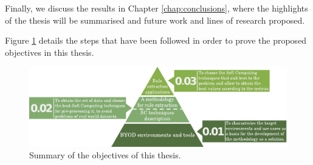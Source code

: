 Finally, we discuss the results in Chapter \ref{chap:conclusions}, where the highlights of the thesis will be summarised and future work and lines of research proposed.

Figure \ref{fig:pyramid} details the steps that have been followed in order to prove the proposed objectives in this thesis.

\begin{figure}
\centering
 \includegraphics[scale =1.3] {gfx/intro/obj_pyramid.pdf}
\caption{Summary of the objectives of this thesis.}
\label{fig:pyramid}
\end{figure}
